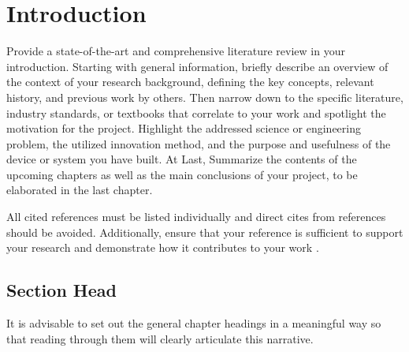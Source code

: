 \documentclass[../individual_thesis.tex]{subfiles}
\begin{document}
\chapter{Introduction}
Provide a state-of-the-art and comprehensive literature review in your introduction. Starting with general information, briefly describe an overview of the context of your research background, defining the key concepts, relevant history, and previous work by others. Then narrow down to the specific literature, industry standards, or textbooks that correlate to your work and spotlight the motivation for the project. Highlight the addressed science or engineering problem, the utilized innovation method, and the purpose and usefulness of the device or system you have built. At Last, Summarize the contents of the upcoming chapters as well as the main conclusions of your project, to be elaborated in the last chapter.

All cited references must be listed individually and direct cites from references should be avoided. Additionally, ensure that your reference is sufficient to support your research and demonstrate how it contributes to your work \cite{John2024}.

\section{Section Head}
It is advisable to set out the general chapter headings in a meaningful way so that reading through them will clearly articulate this narrative.
\end{document}
